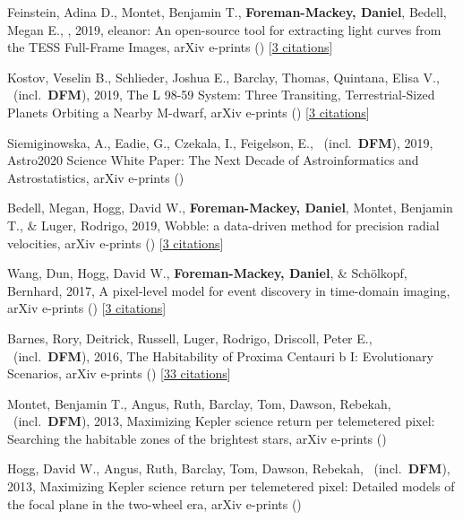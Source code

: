 \item[{\color{numcolor}\scriptsize8}] Feinstein, Adina D., Montet, Benjamin T., \textbf{Foreman-Mackey, Daniel}, Bedell, Megan E., \etal, 2019, eleanor: An open-source tool for extracting light curves from the TESS Full-Frame Images, arXiv e-prints () [\href{http://adsabs.harvard.edu/abs/2019arXiv190309152F}{3 citations}]

\item[{\color{numcolor}\scriptsize7}] Kostov, Veselin B., Schlieder, Joshua E., Barclay, Thomas, Quintana, Elisa V., \etal\ (incl.\ \textbf{DFM}), 2019, The L 98-59 System: Three Transiting, Terrestrial-Sized Planets Orbiting a Nearby M-dwarf, arXiv e-prints () [\href{http://adsabs.harvard.edu/abs/2019arXiv190308017K}{3 citations}]

\item[{\color{numcolor}\scriptsize6}] Siemiginowska, A., Eadie, G., Czekala, I., Feigelson, E., \etal\ (incl.\ \textbf{DFM}), 2019, Astro2020 Science White Paper: The Next Decade of Astroinformatics and Astrostatistics, arXiv e-prints ()

\item[{\color{numcolor}\scriptsize5}] Bedell, Megan, Hogg, David W., \textbf{Foreman-Mackey, Daniel}, Montet, Benjamin T., \& Luger, Rodrigo, 2019, Wobble: a data-driven method for precision radial velocities, arXiv e-prints () [\href{http://adsabs.harvard.edu/abs/2019arXiv190100503B}{3 citations}]

\item[{\color{numcolor}\scriptsize4}] Wang, Dun, Hogg, David W., \textbf{Foreman-Mackey, Daniel}, \& Sch{\"o}lkopf, Bernhard, 2017, A pixel-level model for event discovery in time-domain imaging, arXiv e-prints () [\href{http://adsabs.harvard.edu/abs/2017arXiv171002428W}{3 citations}]

\item[{\color{numcolor}\scriptsize3}] Barnes, Rory, Deitrick, Russell, Luger, Rodrigo, Driscoll, Peter E., \etal\ (incl.\ \textbf{DFM}), 2016, The Habitability of Proxima Centauri b I: Evolutionary Scenarios, arXiv e-prints () [\href{http://adsabs.harvard.edu/abs/2016arXiv160806919B}{33 citations}]

\item[{\color{numcolor}\scriptsize2}] Montet, Benjamin T., Angus, Ruth, Barclay, Tom, Dawson, Rebekah, \etal\ (incl.\ \textbf{DFM}), 2013, Maximizing Kepler science return per telemetered pixel: Searching the habitable zones of the brightest stars, arXiv e-prints ()

\item[{\color{numcolor}\scriptsize1}] Hogg, David W., Angus, Ruth, Barclay, Tom, Dawson, Rebekah, \etal\ (incl.\ \textbf{DFM}), 2013, Maximizing Kepler science return per telemetered pixel: Detailed models of the focal plane in the two-wheel era, arXiv e-prints ()